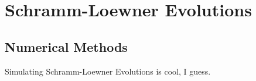 \chapter{Schramm-Loewner Evolutions}
\label{ch:sle}

\section{Numerical Methods}
\label{sec:numsle}

Simulating Schramm-Loewner Evolutions is cool, I guess.
